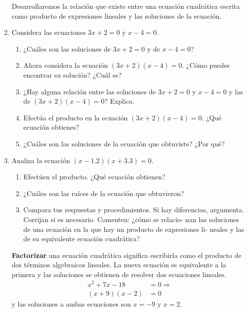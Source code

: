 \documentclass[11pt]{book}
\begin{document}
\begin{enumerate}
        Desarrollaremos la relación que existe entre una ecuación cuadrática escrita como
        producto de expresiones lineales y las soluciones de la ecuación.

  \item Considera las ecuaciones $3x + 2 = 0$ y $x - 4 = 0$.
        \begin{enumerate}
          \item ¿Cuáles son las soluciones de $3x + 2 = 0$ y de $x - 4 = 0$?
          \item Ahora considera la ecuación $(3x + 2)(x - 4) = 0$. ¿Cómo puedes encontrar su solución? ¿Cuál es?
          \item ¿Hay alguna relación entre las soluciones de $3x + 2 = 0$ y $x - 4 = 0$ y las de $(3x + 2)(x - 4) = 0$? Explica.
          \item Efectúa el producto en la ecuación $(3x + 2)(x - 4) = 0$. ¿Qué ecuación obtienes?
          \item ¿Cuáles son las soluciones de la ecuación que obtuviste? ¿Por qué?
        \end{enumerate}

        \newpage

  \item Analiza la ecuación $(x - 1.2) (x + 3.3) = 0$.
        \begin{enumerate}
          \item Efectúen el producto. ¿Qué ecuación obtienen?
          \item ¿Cuáles son las raíces de la ecuación que obtuvieron?
          \item Compara tus respuestas y procedimientos. Si hay diferencias, argumenta. Corrijan si es necesario. Comenten: ¿cómo se relacio-
                nan las soluciones de una ecuación en la que hay un producto de expresiones li-
                neales y las de su equivalente ecuación cuadrática?
        \end{enumerate}

        \begin{boxH}
          \textbf{Factorizar} una ecuación cuadrática significa escribirla como el producto de dos
          términos algebraicos lineales. La nueva ecuación es equivalente a la primera y las
          soluciones se obtienen de resolver dos ecuaciones lineales.
          \begin{align*}
            x^2 + 7x - 18  & = 0 \Rightarrow \\
            (x + 9)(x - 2) & = 0
          \end{align*}
          y las soluciones a ambas ecuaciones son $x = - 9$ y $x = 2$.
        \end{boxH}


\end{enumerate}
\end{document}
